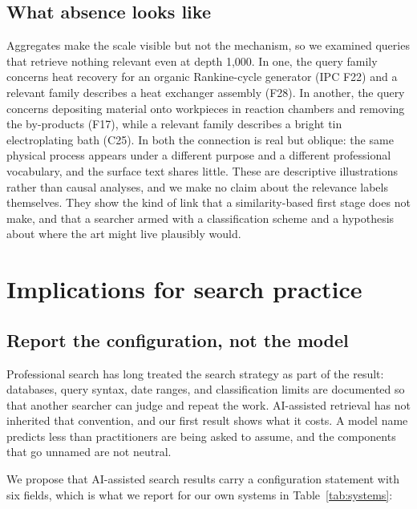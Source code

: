 \documentclass[preprint,11pt,authoryear]{elsarticle}
\begin{document}
\subsection{What absence looks like}

Aggregates make the scale visible but not the mechanism, so we examined queries that retrieve nothing relevant even at depth 1{,}000. In one, the query family concerns heat recovery for an organic Rankine-cycle generator (IPC F22) and a relevant family describes a heat exchanger assembly (F28). In another, the query concerns depositing material onto workpieces in reaction chambers and removing the by-products (F17), while a relevant family describes a bright tin electroplating bath (C25). In both the connection is real but oblique: the same physical process appears under a different purpose and a different professional vocabulary, and the surface text shares little. These are descriptive illustrations rather than causal analyses, and we make no claim about the relevance labels themselves. They show the kind of link that a similarity-based first stage does not make, and that a searcher armed with a classification scheme and a hypothesis about where the art might live plausibly would.

\section{Implications for search practice}
\label{sec:implications}

\subsection{Report the configuration, not the model}

Professional search has long treated the search strategy as part of the result: databases, query syntax, date ranges, and classification limits are documented so that another searcher can judge and repeat the work. AI-assisted retrieval has not inherited that convention, and our first result shows what it costs. A model name predicts less than practitioners are being asked to assume, and the components that go unnamed are not neutral.

We propose that AI-assisted search results carry a configuration statement with six fields, which is what we report for our own systems in Table~\ref{tab:systems}:
\end{document}
